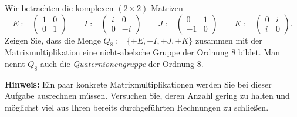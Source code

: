 \begin{Problem}
	Wir betrachten die komplexen $(2 \times  2)$-Matrizen
	\[
		E:=\begin{pmatrix} 1 & 0 \\ 0 & 1 \end{pmatrix} \qquad I:=\begin{pmatrix} i & 0 \\ 0 & -i \end{pmatrix} \qquad J:=\begin{pmatrix} 0 & 1 \\ -1 & 0 \end{pmatrix} \qquad K:=\begin{pmatrix} 0 & i \\ i & 0 \end{pmatrix} 
	.\] 
	Zeigen Sie, dass die Menge $Q_8 := \{\pm E, \pm I, \pm J, \pm K\}$ zusammen mit der Matrixmultiplikation eine nicht-abelsche Gruppe der Ordnung 8 bildet. Man nennt $Q_8$ auch die \emph{Quaternionengruppe} der Ordnung 8.

	\textbf{Hinweis:}  Ein paar konkrete Matrixmultiplikationen werden Sie bei dieser Aufgabe ausrechnen müssen. Versuchen Sie, deren Anzahl gering zu halten und möglichst viel aus Ihren bereits durchgeführten Rechnungen zu schließen.
\end{Problem}
